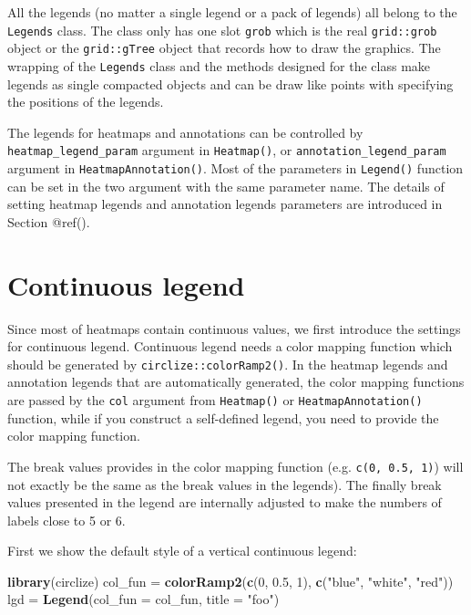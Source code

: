 \documentclass[]{book}
\newenvironment{Shaded}{\begin{snugshade}}{\end{snugshade}}
\newcommand{\KeywordTok}[1]{\textcolor[rgb]{0.13,0.29,0.53}{\textbf{#1}}}
\newcommand{\DataTypeTok}[1]{\textcolor[rgb]{0.13,0.29,0.53}{#1}}
\newcommand{\DecValTok}[1]{\textcolor[rgb]{0.00,0.00,0.81}{#1}}
\newcommand{\FloatTok}[1]{\textcolor[rgb]{0.00,0.00,0.81}{#1}}
\newcommand{\StringTok}[1]{\textcolor[rgb]{0.31,0.60,0.02}{#1}}
\newcommand{\NormalTok}[1]{#1}
\theoremstyle{definition}
\theoremstyle{definition}
\theoremstyle{definition}
\theoremstyle{remark}
\begin{document}
All the legends (no matter a single legend or a pack of legends) all
belong to the \texttt{Legends} class. The class only has one slot
\texttt{grob} which is the real \texttt{grid::grob} object or the
\texttt{grid::gTree} object that records how to draw the graphics. The
wrapping of the \texttt{Legends} class and the methods designed for the
class make legends as single compacted objects and can be draw like
points with specifying the positions of the legends.

The legends for heatmaps and annotations can be controlled by
\texttt{heatmap\_legend\_param} argument in \texttt{Heatmap()}, or
\texttt{annotation\_legend\_param} argument in
\texttt{HeatmapAnnotation()}. Most of the parameters in
\texttt{Legend()} function can be set in the two argument with the same
parameter name. The details of setting heatmap legends and annotation
legends parameters are introduced in Section @ref().

\section{Continuous legend}\label{continuous-legends}

Since most of heatmaps contain continuous values, we first introduce the
settings for continuous legend. Continuous legend needs a color mapping
function which should be generated by \texttt{circlize::colorRamp2()}.
In the heatmap legends and annotation legends that are automatically
generated, the color mapping functions are passed by the \texttt{col}
argument from \texttt{Heatmap()} or \texttt{HeatmapAnnotation()}
function, while if you construct a self-defined legend, you need to
provide the color mapping function.

The break values provides in the color mapping function (e.g.
\texttt{c(0,\ 0.5,\ 1)}) will not exactly be the same as the break
values in the legends). The finally break values presented in the legend
are internally adjusted to make the numbers of labels close to 5 or 6.

First we show the default style of a vertical continuous legend:

\begin{Shaded}
\begin{Highlighting}[]
\KeywordTok{library}\NormalTok{(circlize)}
\NormalTok{col_fun =}\StringTok{ }\KeywordTok{colorRamp2}\NormalTok{(}\KeywordTok{c}\NormalTok{(}\DecValTok{0}\NormalTok{, }\FloatTok{0.5}\NormalTok{, }\DecValTok{1}\NormalTok{), }\KeywordTok{c}\NormalTok{(}\StringTok{"blue"}\NormalTok{, }\StringTok{"white"}\NormalTok{, }\StringTok{"red"}\NormalTok{))}
\NormalTok{lgd =}\StringTok{ }\KeywordTok{Legend}\NormalTok{(}\DataTypeTok{col_fun =}\NormalTok{ col_fun, }\DataTypeTok{title =} \StringTok{"foo"}\NormalTok{)}
\end{Highlighting}
\end{Shaded}
\end{document}
